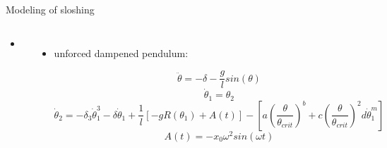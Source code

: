 \documentclass[de]{sdqbeamer}
\begin{document}
\begin{frame}{Modeling of sloshing}
    \begin{columns}
        \begin{itemize}
            \item 
        \end{itemize}        
            \begin{itemize}
                \item unforced dampened pendulum:
                
                \begin{equation}
                \ddot \theta = - \delta - \frac{g}{l} sin(\theta)    
                \end{equation}
                \begin{equation}
                    \dot \theta_1 = \theta_2
                \end{equation}
                \begin{equation}    
                    \dot \theta_2 = -\delta_3 \dot \theta_1^3 - \delta \dot \theta_1 + \frac{1}{l}[-gR(\theta_1) + A(t)] - [a(\frac{\theta}{\theta_{crit}})^b + c(\frac{\theta}{\theta_{crit}})^2d \dot \theta_1^m]
                \end{equation}
                \begin{equation}
                    A(t) = -x_0 \omega^2 sin(\omega t) 
                \end{equation}
            \end{itemize}
    \end{columns}   
\end{frame}

\end{document}
